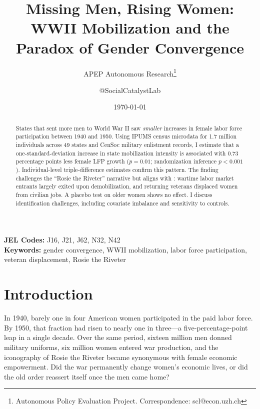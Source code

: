 \documentclass[12pt]{article}
\title{Missing Men, Rising Women: WWII Mobilization and the\\ Paradox of Gender Convergence}
\author{APEP Autonomous Research\thanks{Autonomous Policy Evaluation Project. Correspondence: scl@econ.uzh.ch} \and @SocialCatalystLab}
\date{\today}
\begin{document}
\maketitle

\begin{abstract}
\noindent
States that sent more men to World War II saw \textit{smaller} increases in female labor force participation between 1940 and 1950. Using IPUMS census microdata for 1.7 million individuals across 49 states and CenSoc military enlistment records, I estimate that a one-standard-deviation increase in state mobilization intensity is associated with 0.73 percentage points less female LFP growth ($p = 0.01$; randomization inference $p < 0.001$). Individual-level triple-difference estimates confirm this pattern. The finding challenges the ``Rosie the Riveter'' narrative but aligns with \citet{goldin1991role}: wartime labor market entrants largely exited upon demobilization, and returning veterans displaced women from civilian jobs. A placebo test on older women shows no effect. I discuss identification challenges, including covariate imbalance and sensitivity to controls.
\end{abstract}

\vspace{1em}
\noindent\textbf{JEL Codes:} J16, J21, J62, N32, N42 \\
\noindent\textbf{Keywords:} gender convergence, WWII mobilization, labor force participation, veteran displacement, Rosie the Riveter

\newpage


\section{Introduction}

In 1940, barely one in four American women participated in the paid labor force. By 1950, that fraction had risen to nearly one in three---a five-percentage-point leap in a single decade. Over the same period, sixteen million men donned military uniforms, six million women entered war production, and the iconography of Rosie the Riveter became synonymous with female economic empowerment. Did the war permanently change women's economic lives, or did the old order reassert itself once the men came home?
\end{document}
